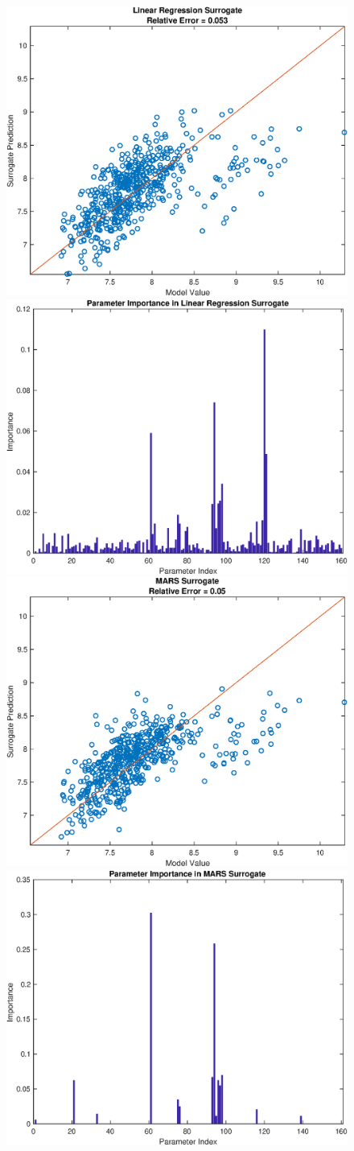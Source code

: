 \documentclass[12pt]{article}
\numberwithin{equation}{section}
\begin{document}
\begin{figure}[h]
\centering
\includegraphics[width=.49 \textwidth]{Figures/K_ECS_Max_QoI_LR_Prediction_Experimental.eps}
\includegraphics[width=.49 \textwidth]{Figures/K_ECS_Max_QoI_LR_VI_Experimental.eps}\\
\includegraphics[width=.49 \textwidth]{Figures/K_ECS_Max_QoI_MARS_Prediction_Experimental.eps}
\includegraphics[width=.49 \textwidth]{Figures/K_ECS_Max_QoI_MARS_VI_Experimental.eps}
\end{figure}
\end{document}
